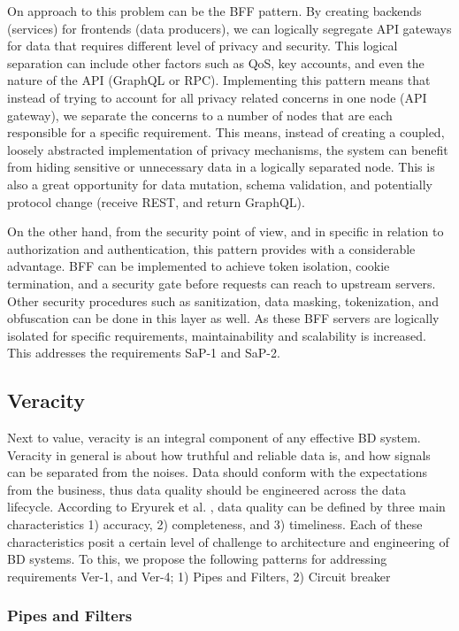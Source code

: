 \documentclass[a4paper,11pt,article,oneside]{memoir}
\begin{document}
On approach to this problem can be the BFF pattern. By creating backends (services) for frontends (data producers), we can logically segregate API gateways for data that requires different level of privacy and security. This logical separation can include other factors such as QoS, key accounts, and even the nature of the API (GraphQL or RPC). Implementing this pattern means that instead of trying to account for all privacy related concerns in one node (API gateway), we separate the concerns to a number of nodes that are each responsible for a specific requirement. This means, instead of creating a coupled, loosely abstracted implementation of privacy mechanisms, the system can benefit from hiding sensitive or unnecessary data in a logically separated node. This is also a great opportunity for data mutation, schema validation, and potentially protocol change (receive REST, and return GraphQL).

On the other hand, from the security point of view, and in specific in relation to authorization and authentication, this pattern provides with a considerable advantage. BFF can be implemented to achieve token isolation, cookie termination, and a security gate before requests can reach to upstream servers. Other security procedures such as sanitization, data masking, tokenization, and obfuscation can be done in this layer as well. As these BFF servers are logically isolated for specific requirements, maintainability and scalability is increased. This addresses the requirements SaP-1 and SaP-2. 


\subsection{Veracity}

Next to value, veracity is an integral component of any effective BD system. Veracity in general is about how truthful and reliable data is, and how signals can be separated from the noises. Data should conform with the expectations from the business, thus data quality should be engineered across the data lifecycle. According to Eryurek et al. \cite{eryurek2021data}, data quality can be defined by three main characteristics 1) accuracy, 2) completeness, and 3) timeliness. Each of these characteristics posit a certain level of challenge to architecture and engineering of BD systems. To this, we propose the following patterns for addressing requirements Ver-1, and Ver-4; 1) Pipes and Filters, 2) Circuit breaker 

\subsubsection{Pipes and Filters}
\end{document}
